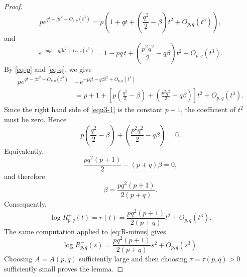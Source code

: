 \documentclass[twoside,12pt]{article}
\numberwithin{equation}{section}
\begin{document}
\begin{proof}
\begin{equation}
 p e^{qt-\beta t^2+O_{p,q}(t^3)}
    =
        p\left(
        1+qt+\left(\frac{q^2}{2}-\beta\right)t^2
        +O_{p,q}(t^3)
        \right),
\end{equation}
and
\begin{equation}\label{eq-q} e^{-pqt-q\beta t^2+O_{p,q}(t^3)}
        =
        1-pq\,t+
        \left(\frac{p^2q^2}{2}-q\beta\right)t^2
        +O_{p,q}(t^3).
\end{equation}
By \eqref{eq-p} and \eqref{eq-q}, we give
\[
\begin{aligned}
        p e^{qt-\beta t^2+O_{p,q}(t^3)}
        &+
        e^{-pqt-q\beta t^2+O_{p,q}(t^3)}  \\
        &=
        p+1+
        \left[
        p\left(\frac{q^2}{2}-\beta\right)
        +
        \left(\frac{p^2q^2}{2}-q\beta\right)
        \right]t^2
        +O_{p,q}(t^3).
\end{aligned}
\]
Since the right hand side of \eqref{equ3-1} is the constant $p+1$,
the coefficient of $t^2$ must be zero. Hence
\[
        p\left(\frac{q^2}{2}-\beta\right)
        +
        \left(\frac{p^2q^2}{2}-q\beta\right)
        =
        0.
\]
Equivalently,
\[
        \frac{p q^2(p+1)}{2}-(p+q)\beta=0,
\]
and therefore
\[
        \beta=\frac{p q^2(p+1)}{2(p+q)}.
\]
Consequently,
\[
        \log R^+_{p,q}(t)
        =
        r(t)
        =
        \frac{p q^2(p+1)}{2(p+q)}t^2
        +
        O_{p,q}(t^3).
\]
The same computation applied to \eqref{eq:R-minus} gives
\[
        \log R^-_{p,q}(s)
        =
        \frac{p q^2(p+1)}{2(p+q)}s^2+O_{p,q}(s^3).
\]
Choosing $A=A(p,q)$ sufficiently large and then choosing
$\tau=\tau(p,q)>0$ sufficiently small proves the lemma.
\end{proof}
\end{document}
